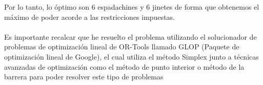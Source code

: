\documentclass[10pt]{article}
\begin{document}
Por lo tanto, lo óptimo son 6 espadachines y 6 jinetes de forma que obtenemos el máximo de poder acorde a las restricciones impuestas.\\
\\
Es importante recalcar que he resuelto el problema utilizando el solucionador de problemas de optimización lineal de OR-Tools llamado GLOP (Paquete de optimización lineal de Google), el cual utiliza el método Simplex junto a técnicas avanzadas de optimización como el método de punto interior o método de la barrera para poder resolver este tipo de problemas
\end{document}
